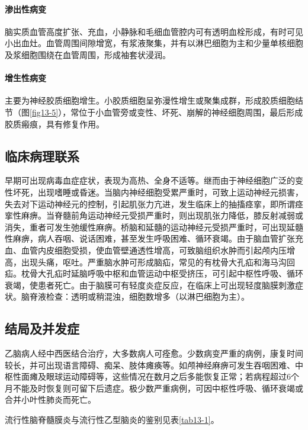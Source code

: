 \paragraph{渗出性病变}
脑实质血管高度扩张、充血，小静脉和毛细血管腔内可有透明血栓形成，有时可见小出血灶。血管周围间隙增宽，有浆液聚集，并有以淋巴细胞为主和少量单核细胞及浆细胞围绕在血管周围，形成袖套状浸润。

\paragraph{增生性病变}
主要为神经胶质细胞增生。小胶质细胞呈弥漫性增生或聚集成群，形成胶质细胞结节（图\ref{fig13-5}），常位于小血管旁或变性、坏死、崩解的神经细胞周围，最后形成胶质瘢痕，具有修复作用。

\subsection{临床病理联系}

早期可出现病毒血症症状，表现为高热、全身不适等。继而由于神经细胞广泛的变性坏死，出现嗜睡或昏迷。当脑内神经细胞受累严重时，可致上运动神经元损害，失去对下运动神经元的控制，引起肌张力亢进，发生临床上的抽搐痉挛，即所谓痉挛性麻痹。当脊髓前角运动神经元受损严重时，则出现肌张力降低，膝反射减弱或消失，重者可发生弛缓性麻痹。桥脑和延髓的运动神经元受损严重时，可出现延髓性麻痹，病人吞咽、说话困难，甚至发生呼吸困难、循环衰竭。由于脑血管扩张充血、血管内皮细胞受损，使血管壁通透性增高，可致脑组织水肿而引起颅内压增高，出现头痛，呕吐。严重脑水肿可形成脑疝，常见的有枕骨大孔疝和海马沟回疝。枕骨大孔疝时延脑呼吸中枢和血管运动中枢受挤压，可引起中枢性呼吸、循环衰竭，使患者死亡。由于脑膜可有轻度炎症反应，在临床上可出现轻度脑膜刺激症状。脑脊液检查：透明或稍混浊，细胞数增多（以淋巴细胞为主）。

\subsection{结局及并发症}

乙脑病人经中西医结合治疗，大多数病人可痊愈。少数病变严重的病例，康复时间较长，并可出现语言障碍、痴呆、肢体瘫痪等。如颅神经麻痹可发生吞咽困难、中枢性面瘫及眼球运动障碍等，这些情况在数月之后多能恢复正常；若病程超过6个月不能及时恢复则可留下后遗症。极少数严重病例，可因中枢性呼吸、循环衰竭或合并小叶性肺炎而死亡。

流行性脑脊髓膜炎与流行性乙型脑炎的鉴别见表\ref{tab13-1}。

